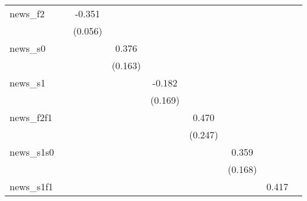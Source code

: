 {\begin{tabular}{l*{8}{c}}
news\_f2     &                     &      -0.351\sym{***}&                     &                     &                     &                     &                     &                     \\
            &                     &     (0.056)         &                     &                     &                     &                     &                     &                     \\
\addlinespace
news\_s0     &                     &                     &       0.376\sym{**} &                     &                     &                     &                     &                     \\
            &                     &                     &     (0.163)         &                     &                     &                     &                     &                     \\
\addlinespace
news\_s1     &                     &                     &                     &      -0.182         &                     &                     &                     &                     \\
            &                     &                     &                     &     (0.169)         &                     &                     &                     &                     \\
\addlinespace
news\_f2f1   &                     &                     &                     &                     &       0.470\sym{*}  &                     &                     &                     \\
            &                     &                     &                     &                     &     (0.247)         &                     &                     &                     \\
\addlinespace
news\_s1s0   &                     &                     &                     &                     &                     &       0.359\sym{**} &                     &                     \\
            &                     &                     &                     &                     &                     &     (0.168)         &                     &                     \\
\addlinespace
news\_s1f1   &                     &                     &                     &                     &                     &                     &       0.417         &                     \\

\end{tabular}}
